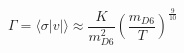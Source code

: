\begin{equation}
\Gamma = \langle \sigma |v| \rangle
\approx  \frac{K}{m_{D6}^2} \left
(\frac{m_{D6}}{T}\right)^{\frac{9}{10}}
\label{xrssect}
\end{equation}

